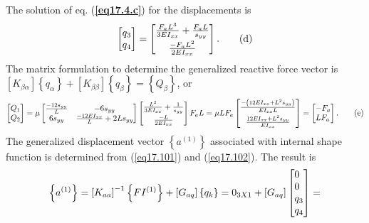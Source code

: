 \documentclass{AeroStructure-ERJohnson}
\begin{document}
\begin{example}
\begin{equation}
\end{equation}
The solution of eq. (\textbf{\ref{eq17.4.c}}) for the displacements is
\begin{equation}
\left[\begin{array}{@{}l@{}}q_{3} \\q_{4}\end{array}\right]=\left[\begin{array}{@{}c@{}}\frac{F_{a} L^{3}}{3 E I_{x x}}+\frac{F_{a} L}{s_{y y}} \\[4pt]
\frac{-F_{a} L^{2}}{2 E I_{x x}}\end{array}\right]. \label{eq17.4.d}\tag{d}
\end{equation}
The matrix formulation to determine the generalized reactive force vector is $\left[K_{\beta \alpha}\right]\left\{q_{\alpha}\right\}+\left[K_{\beta \beta}\right]\left\{q_{\beta}\right\}=\left\{Q_{\beta}\right\}$, or
\begin{equation}
\left[\begin{array}{@{}l@{}}Q_{1} \\Q_{2}\end{array}\right]=\mu\left[\begin{array}{@{}cc@{}}\frac{-12 s_{y y}}{L} & -6 s_{y y} \\6 s_{y y} & \frac{-12 E I_{x x}}{L}+2 L s_{y y}\end{array}\right]\left[\begin{array}{@{}c@{}}\frac{L^{2}}{3 E I_{x x}}+\frac{1}{s_{y y}} \\[4pt]
\frac{-L}{2 E I_{x x}}\end{array}\right] F_{a} L=\mu L F_{a}\left[\begin{array}{@{}c@{}}\frac{-\left(12 E I_{x x}+L^{2} s_{y y}\right)}{E I_{x x} L} \\[4pt]
\frac{12 E I_{x x}+L^{2} s_{y y}}{E I_{x x}}\end{array}\right]=\left[\begin{array}{@{}l@{}}-F_{a} \\L F_{a}\end{array}\right]. \label{eq17.4.e}\tag{e}
\end{equation}
The generalized displacement vector $\left\{a^{(1)}\right\}$ associated with internal shape function is determined from (\ref{eq17.101}) and (\ref{eq17.102}). The result is
\begin{equation}
\left\{a^{(1)}\right\}=\left[K_{a a}\right]^{-1}\left\{F I^{(1)}\right\}+\left[G_{a q}\right]\left\{q_{k}\right\}=0_{3 X 1}+\left[G_{a q}\right]
\left[\begin{array}{@{}l@{}}0 \\0 \\q_{3} \\q_{4}\end{array}\right]=

\end{equation}
\end{example}
\end{document}
